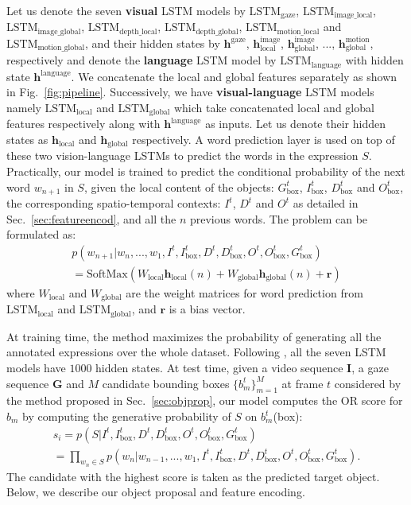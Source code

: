 \documentclass[10pt,twocolumn,letterpaper]{article}
\newcommand{\model}[2]{$\text{#1}_{\text{#2}}$}
\newcommand{\vect}[1]{{\mathbf #1}}
\newcommand{\hstate}[2]{$\vect{h}_{\text{#1}}^{\text{#2}}$}
\begin{document}
Let us denote the seven \textbf{visual} LSTM models by \model{LSTM}{gaze}, \model{LSTM}{image\_local}, \model{LSTM}{image\_global}, \model{LSTM}{depth\_local}, \model{LSTM}{depth\_global}, \model{LSTM}{motion\_local} and \model{LSTM}{motion\_global}, and their hidden states by \hstate{}{gaze}, \hstate{local}{image}, \hstate{global}{image}, ..., \hstate{global}{motion}, respectively and denote the \textbf{language} LSTM model by \model{LSTM}{language} with hidden state \hstate{}{language}. We concatenate the local and global features separately as shown in Fig.~\ref{fig:pipeline}. Successively, we have \textbf{visual-language} LSTM models namely \model{LSTM}{local} and \model{LSTM}{global} which take concatenated local and global features respectively along with \hstate{}{language} as inputs. Let us denote their hidden states as \hstate{local}{} and \hstate{global}{} respectively.
A word prediction layer is used on top of these two vision-language LSTMs to predict the words in the expression $S$. Practically, our model is trained to predict the conditional probability of the next word $w_{n+1}$ in $S$,  given the local content of the objects: $G_{\text{box}}^t$, $I_{\text{box}}^t$, $D_{\text{box}}^t$ and $O_{\text{box}}^t$, the corresponding spatio-temporal contexts: $I^t$, $D^t$ and $O^t$ as detailed in Sec.~\ref{sec:featureencod}, and all the $n$ previous words. The problem can be formulated as: 
\begin{multline}
p(w_{n+1}|w_n, ..., w_{1}, I^t, I_{\text{box}}^t, D^t, D_{\text{box}}^t, O^t, O_{\text{box}}^t, G_{\text{box}}^t) \\
= \text{SoftMax}(W_{\text{local}}\vect{h}_{\text{local}}(n) + W_{\text{global}}\vect{h}_{\text{global}}(n) + \vect{r})
\end{multline}
where $W_{\text{local}}$ and $W_{\text{global}}$ are the weight matrices for word prediction from \model{LSTM}{local} and \model{LSTM}{global}, and $\vect{r}$ is a bias vector.  

At training time, the method maximizes the probability of generating all the annotated expressions over the whole dataset. Following \cite{hu2016natural}, all the seven LSTM models have $1000$ hidden states. 
At test time, given a video sequence $\mathbf{I}$, a gaze sequence $\mathbf{G}$ and $M$ candidate bounding boxes $\{b_m^t\}_{m=1}^M$ at frame $t$ considered by the method proposed in Sec.~\ref{sec:objprop}, our model computes the OR score for $b_m$ by computing the generative probability of $S$ on $b_m^t$(box):
\begingroup\makeatletter\def\f@size{8}\check@mathfonts
\begin{multline}
s_i=p(S|I^t, I_{\text{box}}^t, D^t, D_{\text{box}}^t, O^t, O_{\text{box}}^t, G_{\text{box}}^t) \\
=\prod_{w_n \in S}{p(w_n|w_{n-1}, ..., w_1, I^t, I_{\text{box}}^t, D^t, D_{\text{box}}^t, O^t, O_{\text{box}}^t, G_{\text{box}}^t ).} 
\end{multline}
\endgroup
The candidate with the highest score is taken as the predicted target object. Below, we describe our object proposal and feature encoding. 
\end{document}
